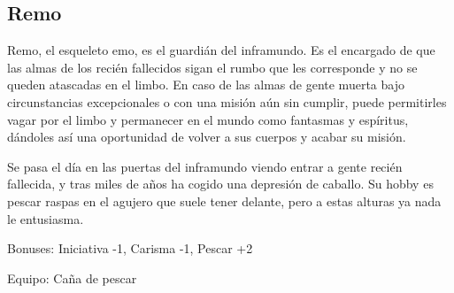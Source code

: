 \subsection*{Remo}

Remo, el esqueleto emo, es el guardián del inframundo. Es el encargado de que las almas de los recién fallecidos sigan el rumbo que les corresponde y no se queden atascadas en el limbo. En caso de las almas de gente muerta bajo circunstancias excepcionales o con una misión aún sin cumplir, puede permitirles vagar por el limbo y permanecer en el mundo como fantasmas y espíritus, dándoles así una oportunidad de volver a sus cuerpos y acabar su misión. 
\par  
Se pasa el día en las puertas del inframundo viendo entrar a gente recién fallecida, y tras miles de años ha cogido una depresión de caballo. Su hobby es pescar raspas en el agujero que suele tener delante, pero a estas alturas ya nada le entusiasma. 
\par  
Bonuses: Iniciativa -1, Carisma -1, Pescar +2
\par  
Equipo: Caña de pescar
